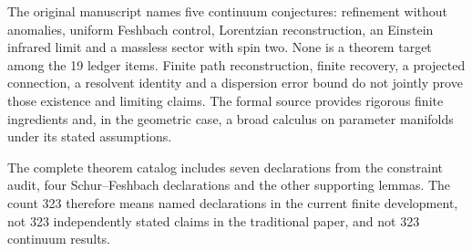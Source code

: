 The original manuscript names five continuum conjectures: refinement without anomalies, uniform Feshbach control, Lorentzian reconstruction, an Einstein infrared limit and a massless sector with spin two. None is a theorem target among the 19 ledger items. Finite path reconstruction, finite recovery, a projected connection, a resolvent identity and a dispersion error bound do not jointly prove those existence and limiting claims. The formal source provides rigorous finite ingredients and, in the geometric case, a broad calculus on parameter manifolds under its stated assumptions.

The complete theorem catalog includes seven declarations from the constraint audit, four Schur--Feshbach declarations and the other supporting lemmas. The count 323 therefore means named declarations in the current finite development, not 323 independently stated claims in the traditional paper, and not 323 continuum results.
